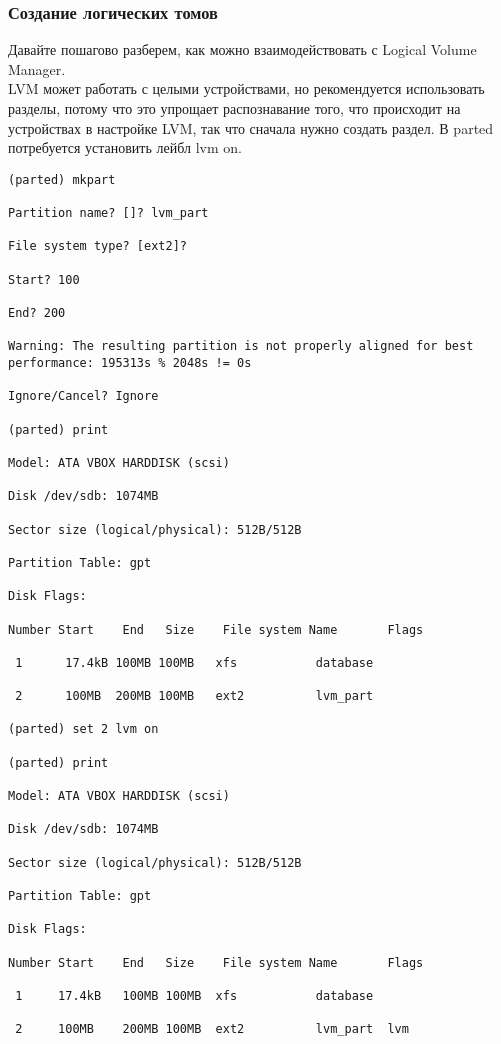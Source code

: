 \documentclass[14pt, a4paper]{article}
\begin{document}
\subsubsection*{Создание логических томов} 

Давайте пошагово разберем, как можно взаимодействовать с Logical Volume Manager.\\

LVM может работать с целыми устройствами, но рекомендуется использовать разделы, потому что это
упрощает распознавание того, что происходит на устройствах в настройке LVM, так что сначала нужно
создать раздел. В parted потребуется установить лейбл \colorbox{backcolour}{lvm on}.

\vspace{0.3cm}

\begin{lstlisting}
(parted) mkpart

Partition name? []? lvm_part

File system type? [ext2]?

Start? 100

End? 200

Warning: The resulting partition is not properly aligned for best 
performance: 195313s % 2048s != 0s

Ignore/Cancel? Ignore

(parted) print

Model: ATA VBOX HARDDISK (scsi)

Disk /dev/sdb: 1074MB

Sector size (logical/physical): 512B/512B

Partition Table: gpt

Disk Flags:

Number Start    End   Size    File system Name       Flags

 1      17.4kB 100MB 100MB   xfs           database

 2      100MB  200MB 100MB   ext2          lvm_part

(parted) set 2 lvm on

(parted) print

Model: ATA VBOX HARDDISK (scsi)

Disk /dev/sdb: 1074MB

Sector size (logical/physical): 512B/512B

Partition Table: gpt

Disk Flags:

Number Start    End   Size    File system Name       Flags

 1     17.4kB   100MB 100MB  xfs           database

 2     100MB    200MB 100MB  ext2          lvm_part  lvm

\end{lstlisting}
\end{document}
